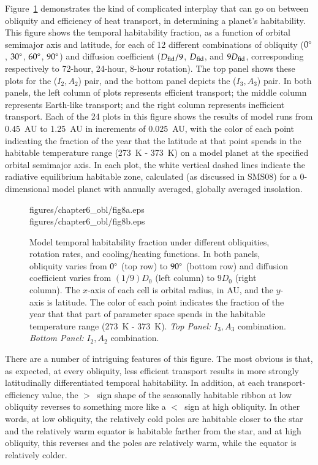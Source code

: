 Figure~\ref{obl_fig:obliq_rotI2A2I3A3} demonstrates the kind of
complicated interplay that can go on between obliquity and efficiency
of heat transport, in determining a planet's habitability.  This
figure shows the temporal habitability fraction, as a function of
orbital semimajor axis and latitude, for each of 12 different
combinations of obliquity ($0\mbox{$^\circ$}$, $30\mbox{$^\circ$}$, $60\mbox{$^\circ$}$, $90\mbox{$^\circ$}$)
and diffusion coefficient ($D_{\rm fid}/9$, $D_{\rm fid}$, and
$9D_{\rm fid}$, corresponding respectively to 72-hour, 24-hour, 8-hour
rotation).  The top panel shows these plots for the ($I_2,A_2$) pair,
and the bottom panel depicts the ($I_3,A_3$) pair.  In both panels,
the left column of plots represents efficient transport; the middle
column represents Earth-like transport; and the right column
represents inefficient transport.  Each of the 24 plots in this figure
shows the results of model runs from $0.45$~AU to 1.25~AU in
increments of $0.025$~AU, with the color of each point indicating the
fraction of the year that the latitude at that point spends in the
habitable temperature range (273~K - 373~K) on a model planet at the
specified orbital semimajor axis.  In each plot, the white vertical
dashed lines indicate the radiative equilibrium habitable zone,
calculated (as discussed in SMS08) for a 0-dimensional model planet
with annually averaged, globally averaged insolation.

\begin{figure}[p]
\plotone
{figures/chapter6_obl/fig8a.eps}\\
\plotone
{figures/chapter6_obl/fig8b.eps}
\caption[Model temporal habitability fraction under different
obliquities, rotation rates, and cooling/heating functions.]{Model
temporal habitability fraction under different obliquities, rotation
rates, and cooling/heating functions. In both panels, obliquity varies
from $0\mbox{$^\circ$}$ (top row) to $90\mbox{$^\circ$}$ (bottom row) and diffusion
coefficient varies from $(1/9)D_0$ (left column) to $9D_0$ (right
column).  The $x$-axis of each cell is orbital radius, in AU, and the
$y$-axis is latitude.  The color of each point indicates the fraction
of the year that that part of parameter space spends in the habitable
temperature range (273~K - 373~K).  {\it Top Panel:} $I_3,A_3$
combination. {\it Bottom Panel:} $I_2,A_2$ combination.}
\label{obl_fig:obliq_rotI2A2I3A3}
\end{figure}
\afterpage{\clearpage}

There are a number of intriguing features of this figure.  The most
obvious is that, as expected, at every obliquity, less efficient
transport results in more strongly latitudinally differentiated
temporal habitability.  In addition, at each transport-efficiency
value, the {\tt $>$}~sign shape of the seasonally habitable ribbon at
low obliquity reverses to something more like a {\tt $<$}~sign at high
obliquity.  In other words, at low obliquity, the relatively cold
poles are habitable closer to the star and the relatively warm equator
is habitable farther from the star, and at high obliquity, this
reverses and the poles are relatively warm, while the equator is
relatively colder.

